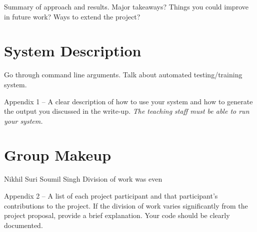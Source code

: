 \documentclass[11pt]{article}
\begin{document}
Summary of approach and results. Major takeaways? Things you could improve in future work? Ways to extend the project?

\appendix

\section{System Description}

Go through command line arguments. Talk about automated testing/training system.

 Appendix 1 – A clear description of how to use your system and how to generate the output you discussed in the write-up. \emph{The teaching staff must be able to run your system.}

\section{Group Makeup}

Nikhil Suri
Soumil Singh
Division of work was even

 Appendix 2 – A list of each project participant and that
participant’s contributions to the project. If the division of work
varies significantly from the project proposal, provide a brief
explanation.  Your code should be clearly documented.




\end{document}
